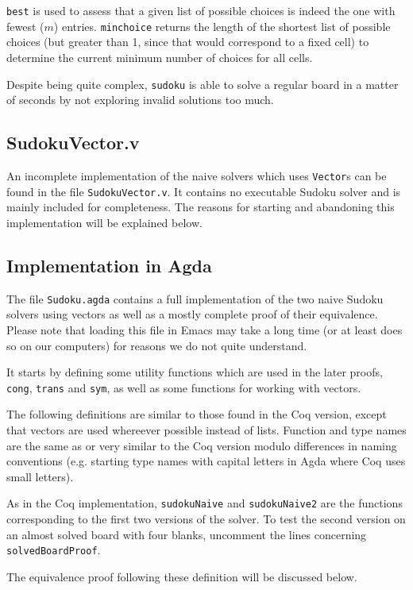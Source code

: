 \documentclass[a4paper,11pt]{article}
\begin{document}
\texttt{best} is used to assess that a given list of possible choices is indeed the one with fewest (\(m\)) entries. \texttt{minchoice} returns the length of the shortest list of possible choices (but greater than 1, since that would correspond to a fixed cell) to determine the current minimum number of choices for all cells.

Despite being quite complex, \texttt{sudoku} is able to solve a regular board in a matter of seconds by not exploring invalid solutions too much.

\subsection{SudokuVector.v}
An incomplete implementation of the naive solvers which uses \texttt{Vector}s can be found in the file \texttt{SudokuVector.v}. It contains no executable Sudoku solver and is mainly included for completeness. The reasons for starting and abandoning this implementation will be explained below.

\subsection{Implementation in Agda}
The file \texttt{Sudoku.agda} contains a full implementation of the two naive Sudoku solvers using vectors as well as a mostly complete proof of their equivalence. Please note that loading this file in Emacs may take a long time (or at least does so on our computers) for reasons we do not quite understand.

It starts by defining some utility functions which are used in the later proofs, \texttt{cong}, \texttt{trans} and \texttt{sym}, as well as some functions for working with vectors.

The following definitions are similar to those found in the Coq version, except that vectors are used whereever possible instead of lists. Function and type names are the same as or very similar to the Coq version modulo differences in naming conventions (e.g. starting type names with capital letters in Agda where Coq uses small letters). 

As in the Coq implementation, \texttt{sudokuNaive} and \texttt{sudokuNaive2} are the functions corresponding to the first two versions of the solver. To test the second version on an almost solved board with four blanks, uncomment the lines concerning \texttt{solvedBoardProof}.

The equivalence proof following these definition will be discussed below.
\end{document}
